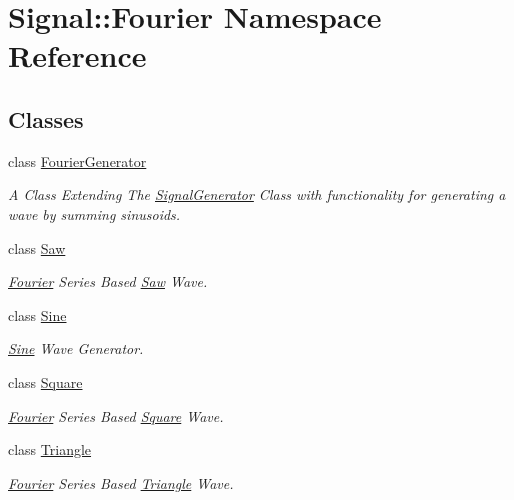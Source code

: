 \hypertarget{namespaceSignal_1_1Fourier}{\section{Signal\+:\+:Fourier Namespace Reference}
\label{namespaceSignal_1_1Fourier}
}
\subsection*{Classes}
\begin{DoxyCompactItemize}
\item 
class \hyperlink{classSignal_1_1Fourier_1_1FourierGenerator}{Fourier\+Generator}
\begin{DoxyCompactList}\small\item\em A Class Extending The \hyperlink{classSignal_1_1SignalGenerator}{Signal\+Generator} Class with functionality for generating a wave by summing sinusoids. \end{DoxyCompactList}\item 
class \hyperlink{classSignal_1_1Fourier_1_1Saw}{Saw}
\begin{DoxyCompactList}\small\item\em \hyperlink{namespaceSignal_1_1Fourier}{Fourier} Series Based \hyperlink{classSignal_1_1Fourier_1_1Saw}{Saw} Wave. \end{DoxyCompactList}\item 
class \hyperlink{classSignal_1_1Fourier_1_1Sine}{Sine}
\begin{DoxyCompactList}\small\item\em \hyperlink{classSignal_1_1Fourier_1_1Sine}{Sine} Wave Generator. \end{DoxyCompactList}\item 
class \hyperlink{classSignal_1_1Fourier_1_1Square}{Square}
\begin{DoxyCompactList}\small\item\em \hyperlink{namespaceSignal_1_1Fourier}{Fourier} Series Based \hyperlink{classSignal_1_1Fourier_1_1Square}{Square} Wave. \end{DoxyCompactList}\item 
class \hyperlink{classSignal_1_1Fourier_1_1Triangle}{Triangle}
\begin{DoxyCompactList}\small\item\em \hyperlink{namespaceSignal_1_1Fourier}{Fourier} Series Based \hyperlink{classSignal_1_1Fourier_1_1Triangle}{Triangle} Wave. \end{DoxyCompactList}\end{DoxyCompactItemize}
